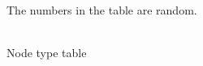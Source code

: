 \documentclass[11pt]{article}
\begin{document}
    The numbers in the table are random.

     \\

    Node type table \\
    
    
    
\end{document}
